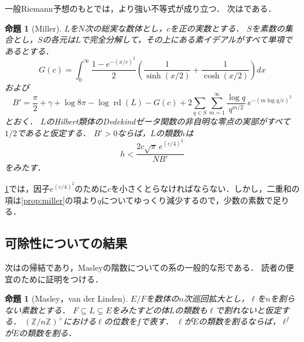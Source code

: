 \documentclass[11pt,a4paper]{ltjsarticle}
\theoremstyle{ja}
\newtheorem{proposition}[theorem]{命題}
\begin{document}
一般Riemann予想のもとでは，より強い不等式が成り立つ．
次は\cite[Lemma 5.2]{Mi14}である．

\begin{proposition}[Miller] \label{prop:millergrh}
$L$を$N$次の総実な数体とし，$c$を正の実数とする．
$S$を素数の集合とし，$S$の各元は$L$で完全分解して，その上にある素イデアルがすべて単項であるとする．
\[
G(c) = \int_0^\infty \frac{1 - e^{-(x/c)^2}}{2} \left( \frac{1}{\sinh(x/2)} + \frac{1}{\cosh(x/2)} \right) dx
\]
および
\[
B' = \frac{\pi}{2} + \gamma + \log 8\pi - \log \operatorname{rd}(L) - G(c) + 2 \sum_{q \in S} \sum_{m=1}^{\infty} \frac{\log q}{q^{m/2}} \, e^{-(m \log q/c)^2}
\]
とおく．
$L$のHilbert類体のDedekindゼータ関数の非自明な零点の実部がすべて$1/2$であると仮定する．
$B' > 0$ならば，$L$の類数$h$は
\[
h < \frac{2c\sqrt{\pi} \, e^{(c/4)^2}}{N B'}
\]
をみたす．
\end{proposition}

\cref{prop:millergrh}では，因子$e^{(c/4)^2}$のために$c$を小さくとらなければならない．しかし，二重和の項は\cref{prop:miller}の項より$q$についてゆっくり減少するので，少数の素数で足りる．

\subsection{可除性についての結果}

次は\cite[Theorems 6 and 8]{vdL82}の帰結であり，Masleyの階数についての系\cite[Corollary 2.15]{Ma78}の一般的な形である．
読者の便宜のために証明をつける．

\begin{proposition}[Masley，van der Linden] \label{prop:masley}
$E/F$を数体の$n$次巡回拡大とし，$\ell$を$n$を割らない素数とする．
$F \subseteq L \subsetneq E$をみたすどの体$L$の類数も$\ell$で割れないと仮定する．
$(\mathbb{Z}/n\mathbb{Z})^\times$における$\ell$の位数を$f$で表す．
$\ell$が$E$の類数を割るならば，$\ell^f$が$E$の類数を割る．
\end{proposition}
\end{document}
